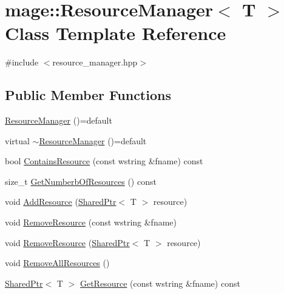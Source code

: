 \hypertarget{classmage_1_1_resource_manager}{}\section{mage\+:\+:Resource\+Manager$<$ T $>$ Class Template Reference}
\label{classmage_1_1_resource_manager}


{\ttfamily \#include $<$resource\+\_\+manager.\+hpp$>$}

\subsection*{Public Member Functions}
\begin{DoxyCompactItemize}
\item 
\hyperlink{classmage_1_1_resource_manager_aeb324963a4bb56a359535b49930cbe9d}{Resource\+Manager} ()=default
\item 
virtual \hyperlink{classmage_1_1_resource_manager_a60685932f6c5f40333cd1e072a6f8c81}{$\sim$\+Resource\+Manager} ()=default
\item 
bool \hyperlink{classmage_1_1_resource_manager_aa949bc8f75672696a960de424dcd36cc}{Contains\+Resource} (const wstring \&fname) const
\item 
size\+\_\+t \hyperlink{classmage_1_1_resource_manager_a1872b087dac1794746b320c6ece63fd8}{Get\+Numberb\+Of\+Resources} () const
\item 
void \hyperlink{classmage_1_1_resource_manager_a2f080e5351d7d9a5db939e457300c232}{Add\+Resource} (\hyperlink{namespacemage_a1e01ae66713838a7a67d30e44c67703e}{Shared\+Ptr}$<$ T $>$ resource)
\item 
void \hyperlink{classmage_1_1_resource_manager_af805bcef1e71693e215741472c7d9534}{Remove\+Resource} (const wstring \&fname)
\item 
void \hyperlink{classmage_1_1_resource_manager_ac557e5047590d0403291557c88966574}{Remove\+Resource} (\hyperlink{namespacemage_a1e01ae66713838a7a67d30e44c67703e}{Shared\+Ptr}$<$ T $>$ resource)
\item 
void \hyperlink{classmage_1_1_resource_manager_a25b8838bb73dfbc2c6589fae7da0099e}{Remove\+All\+Resources} ()
\item 
\hyperlink{namespacemage_a1e01ae66713838a7a67d30e44c67703e}{Shared\+Ptr}$<$ T $>$ \hyperlink{classmage_1_1_resource_manager_a8196c2ab8b01b5afbae191ea342141e3}{Get\+Resource} (const wstring \&fname) const
\end{DoxyCompactItemize}
